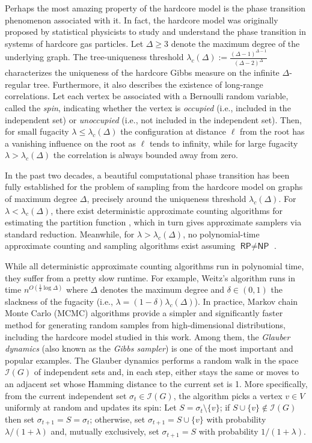\documentclass[11pt]{article}
\theoremstyle{plain}
\theoremstyle{definition}
\theoremstyle{remark}
\newcommand{\II}{\mathcal{I}}
\begin{document}
Perhaps the most amazing property of the hardcore model is the phase transition phenomenon associated with it. In fact, the hardcore model was originally proposed by statistical physicists to study and understand the phase transition in systems of hardcore gas particles. 
Let $\Delta \ge 3$ denote the maximum degree of the underlying graph.
The tree-uniqueness threshold $\lambda_c(\Delta) := \frac{(\Delta-1)^{\Delta-1}}{(\Delta-2)^\Delta}$ characterizes the uniqueness of the hardcore Gibbs measure on the infinite $\Delta$-regular tree. Furthermore, it also describes the existence of long-range correlations. 
Let each vertex be associated with a Bernoulli random variable, called the \emph{spin}, indicating whether the vertex is \emph{occupied} (i.e., included in the independent set) or \emph{unoccupied} (i.e., not included in the independent set).
Then, for small fugacity $\lambda \le \lambda_c(\Delta)$ the configuration at distance $\ell$ from the root has a vanishing influence on the root as $\ell$ tends to infinity, while for large fugacity $\lambda > \lambda_c(\Delta)$ the correlation is always bounded away from zero.

In the past two decades, a beautiful computational phase transition has been fully established for the problem of sampling from the hardcore model on graphs of maximum degree $\Delta$, precisely around the uniqueness threshold $\lambda_c(\Delta)$.
For $\lambda < \lambda_c(\Delta)$, there exist deterministic approximate counting algorithms for estimating the partition function \cite{weitz2006counting,Bar06,peters2019conjecture}, which in turn gives approximate samplers via standard reduction. 
Meanwhile, for $\lambda > \lambda_c(\Delta)$, no polynomial-time approximate counting and sampling algorithms exist assuming $\textsf{RP} \neq \textsf{NP}$ \cite{sly2010computational,sly2012computational,GSV16}.

While all deterministic approximate counting algorithms run in polynomial time, they suffer from a pretty slow runtime.
For example, Weitz's algorithm \cite{weitz2006counting} runs in time $n^{O( \frac{1}{\delta} \log \Delta)}$ where $\Delta$ denotes the maximum degree and $\delta \in (0,1)$ the slackness of the fugacity (i.e., $\lambda = (1-\delta) \lambda_c(\Delta)$).
In practice, Markov chain Monte Carlo (MCMC) algorithms provide a simpler and significantly faster method for generating random samples from high-dimensional distributions, including the hardcore model studied in this work. 
Among them, the \emph{Glauber dynamics} (also known as the \emph{Gibbs sampler}) is one of the most important and popular examples.
The Glauber dynamics performs a random walk in the space $\II(G)$ of independent sets and, in each step, either stays the same or moves to an adjacent set whose Hamming distance to the current set is 1.
More specifically, from the current independent set $\sigma_t \in \II(G)$, the algorithm picks a vertex $v \in V$ uniformly at random and updates its spin: Let $S = \sigma_t \setminus \{v\}$; if $S \cup \{v\} \notin \II(G)$ then set $\sigma_{t+1} = S = \sigma_t$; otherwise, set $\sigma_{t+1} = S \cup \{v\}$ with probability $\lambda/(1+\lambda)$ and, mutually exclusively, set $\sigma_{t+1} = S$ with probability $1/(1+\lambda)$.
\end{document}
